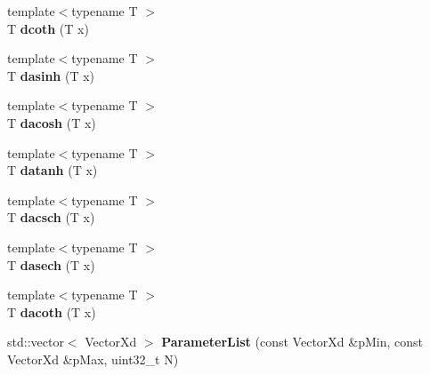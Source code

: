 \begin{DoxyCompactItemize}
\item 
\hypertarget{namespace_d_r_d_s_p_a7f24d239ca28caf3faf3f89e8fe19873}{{\footnotesize template$<$typename T $>$ }\\T {\bfseries dcoth} (T x)}\label{namespace_d_r_d_s_p_a7f24d239ca28caf3faf3f89e8fe19873}

\item 
\hypertarget{namespace_d_r_d_s_p_a970a0e0220f4584fe2b3cd20710aa117}{{\footnotesize template$<$typename T $>$ }\\T {\bfseries dasinh} (T x)}\label{namespace_d_r_d_s_p_a970a0e0220f4584fe2b3cd20710aa117}

\item 
\hypertarget{namespace_d_r_d_s_p_a06b305e94dd4ce0ed25dc098976cf6c5}{{\footnotesize template$<$typename T $>$ }\\T {\bfseries dacosh} (T x)}\label{namespace_d_r_d_s_p_a06b305e94dd4ce0ed25dc098976cf6c5}

\item 
\hypertarget{namespace_d_r_d_s_p_ae69d0af626f4617d940d1228c7bfa676}{{\footnotesize template$<$typename T $>$ }\\T {\bfseries datanh} (T x)}\label{namespace_d_r_d_s_p_ae69d0af626f4617d940d1228c7bfa676}

\item 
\hypertarget{namespace_d_r_d_s_p_a26f1292b057d381074af05089027acaa}{{\footnotesize template$<$typename T $>$ }\\T {\bfseries dacsch} (T x)}\label{namespace_d_r_d_s_p_a26f1292b057d381074af05089027acaa}

\item 
\hypertarget{namespace_d_r_d_s_p_a2084620a797bbe2cabda1b37069ddbb5}{{\footnotesize template$<$typename T $>$ }\\T {\bfseries dasech} (T x)}\label{namespace_d_r_d_s_p_a2084620a797bbe2cabda1b37069ddbb5}

\item 
\hypertarget{namespace_d_r_d_s_p_ac138ca785bb116c23f06d3666cf143d2}{{\footnotesize template$<$typename T $>$ }\\T {\bfseries dacoth} (T x)}\label{namespace_d_r_d_s_p_ac138ca785bb116c23f06d3666cf143d2}

\item 
\hypertarget{namespace_d_r_d_s_p_a49ed0c8501bbbcbe18585d160d2c22d1}{std\-::vector$<$ Vector\-Xd $>$ {\bfseries Parameter\-List} (const Vector\-Xd \&p\-Min, const Vector\-Xd \&p\-Max, uint32\-\_\-t N)}\label{namespace_d_r_d_s_p_a49ed0c8501bbbcbe18585d160d2c22d1}


\end{DoxyCompactItemize}
